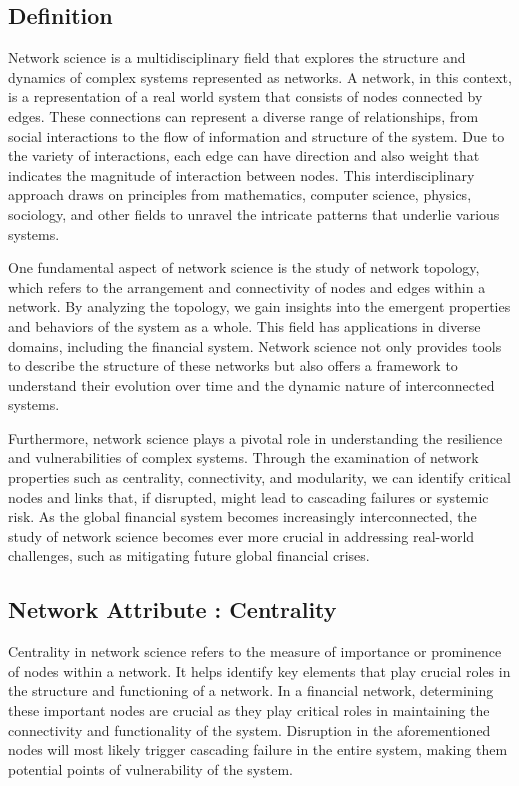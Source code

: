 \documentclass[a4paper,11pt]{article}
\begin{document}
\subsection{Definition}
Network science is a multidisciplinary field that explores the structure and dynamics of complex systems represented as networks. A network, in this context, is a representation of a real world system that consists of nodes connected by edges. These connections can represent a diverse range of relationships, from social interactions to the flow of information and structure of the system. Due to the variety of interactions, each edge can have direction and also weight that indicates the magnitude of interaction between nodes. This interdisciplinary approach draws on principles from mathematics, computer science, physics, sociology, and other fields to unravel the intricate patterns that underlie various systems.

One fundamental aspect of network science is the study of network topology, which refers to the arrangement and connectivity of nodes and edges within a network. By analyzing the topology, we gain insights into the emergent properties and behaviors of the system as a whole. This field has applications in diverse domains, including the financial system. Network science not only provides tools to describe the structure of these networks but also offers a framework to understand their evolution over time and the dynamic nature of interconnected systems.

Furthermore, network science plays a pivotal role in understanding the resilience and vulnerabilities of complex systems. Through the examination of network properties such as centrality, connectivity, and modularity, we can identify critical nodes and links that, if disrupted, might lead to cascading failures or systemic risk. As the global financial system becomes increasingly interconnected, the study of network science becomes ever more crucial in addressing real-world challenges, such as mitigating future global financial crises.

\subsection{Network Attribute : Centrality}
Centrality in network science refers to the measure of importance or prominence of nodes within a network. It helps identify key elements that play crucial roles in the structure and functioning of a network. In a financial network, determining these important nodes are crucial as they play critical roles in maintaining the connectivity and functionality of the system. Disruption in the aforementioned nodes will most likely trigger cascading failure in the entire system, making them potential points of vulnerability of the system.
\end{document}
